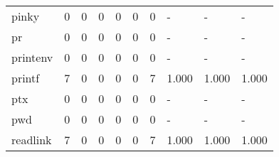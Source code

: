 \begin{longtable}{lp{2.0cm}p{2.0cm}p{2.0cm}p{2.0cm}p{2.0cm}p{2.0cm}p{2.0cm}p{2.0cm}p{2.0cm}}
pinky     &                      0 &                                  0 &                                 0 &                                0 &                                 0 &                               0 &                                    - &                                      - &                                    - \\
pr        &                      0 &                                  0 &                                 0 &                                0 &                                 0 &                               0 &                                    - &                                      - &                                    - \\
printenv  &                      0 &                                  0 &                                 0 &                                0 &                                 0 &                               0 &                                    - &                                      - &                                    - \\
printf    &                      7 &                                  0 &                                 0 &                                0 &                                 0 &                               7 &                                1.000 &                                  1.000 &                                1.000 \\
ptx       &                      0 &                                  0 &                                 0 &                                0 &                                 0 &                               0 &                                    - &                                      - &                                    - \\
pwd       &                      0 &                                  0 &                                 0 &                                0 &                                 0 &                               0 &                                    - &                                      - &                                    - \\
readlink  &                      7 &                                  0 &                                 0 &                                0 &                                 0 &                               7 &                                1.000 &                                  1.000 &                                1.000 \\

\end{longtable}
